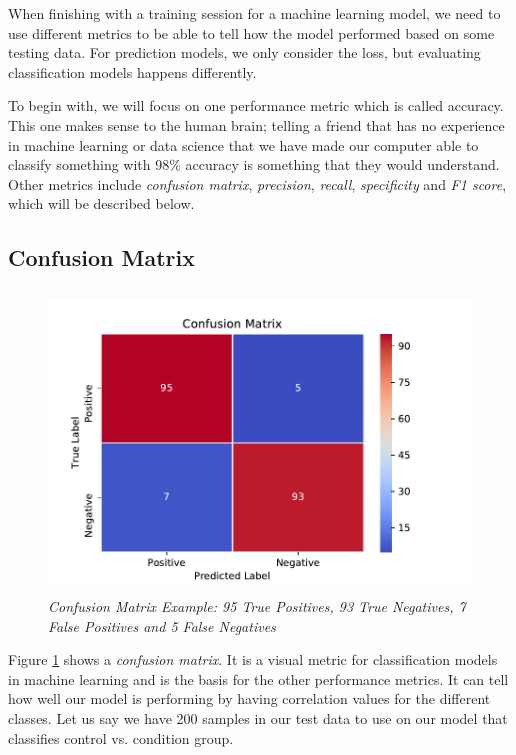 When finishing with a training session for a machine learning model, we need to use different metrics to be able to tell how the model performed based on some testing data. For prediction models, we only consider the loss, but evaluating classification models happens differently. 

To begin with, we will focus on one performance metric which is called accuracy. This one makes sense to the human brain; telling a friend that has no experience in machine learning or data science that we have made our computer able to classify something with 98\% accuracy is something that they would understand. Other metrics include \textit{confusion matrix}, \textit{precision}, \textit{recall}, \textit{specificity} and \textit{F1 score}, which will be described below.

\subsection{Confusion Matrix}

\begin{figure}[h]
  \begin{center}
    \includegraphics[height=8cm]{img/conf_matrix.pdf}
    \caption{\textit{Confusion Matrix Example: 95 True Positives, 93 True Negatives, 7 False Positives and 5 False Negatives}}
    \label{figure:confusion_matrix_bipolar}
  \end{center}
\end{figure}

Figure \ref{figure:confusion_matrix_bipolar} shows a \textit{confusion matrix}. It is a visual metric for classification models in machine learning and is the basis for the other performance metrics. It can tell how well our model is performing by having correlation values for the different classes. Let us say we have 200 samples in our test data to use on our model that classifies control vs. condition group. 

